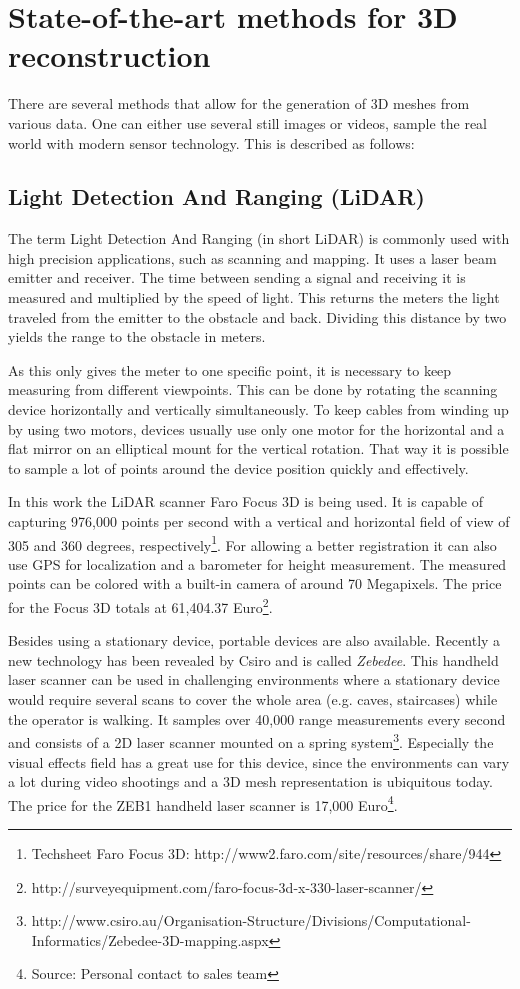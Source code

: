 \section{State-of-the-art methods for 3D reconstruction}

There are several methods that allow for the generation of 3D meshes from various data. One can either use several still images or videos, sample the real world with modern sensor technology. This is described as follows:

\subsection{Light Detection And Ranging (LiDAR)}

The term Light Detection And Ranging (in short LiDAR) is commonly used with high precision applications, such as scanning and mapping. It uses a laser beam emitter and receiver. The time between sending a signal and receiving it is measured and multiplied by the speed of light. This returns the meters the light traveled from the emitter to the obstacle and back. Dividing this distance by two yields the range to the obstacle in meters.

As this only gives the meter to one specific point, it is necessary to keep measuring from different viewpoints. This can be done by rotating the scanning device horizontally and vertically simultaneously. To keep cables from winding up by using two motors, devices usually use only one motor for the horizontal and a flat mirror on an elliptical mount for the vertical rotation. That way it is possible to sample a lot of points around the device position quickly and effectively.

In this work the LiDAR scanner Faro Focus 3D is being used. It is capable of capturing 976,000 points per second with a vertical and horizontal field of view of 305 and 360 degrees, respectively\footnote{Techsheet Faro Focus 3D: http://www2.faro.com/site/resources/share/944}. For allowing a better registration it can also use GPS for localization and a barometer for height measurement. The measured points can be colored with a built-in camera of around 70 Megapixels. The price for the Focus 3D totals at 61,404.37 Euro\footnote{http://surveyequipment.com/faro-focus-3d-x-330-laser-scanner/}.

Besides using a stationary device, portable devices are also available. Recently a new technology has been revealed by Csiro and is called \textit{Zebedee}. This handheld laser scanner can be used in challenging environments where a stationary device would require several scans to cover the whole area (e.g. caves, staircases) while the operator is walking. It samples over 40,000 range measurements every second and consists of a 2D laser scanner mounted on a spring system\footnote{http://www.csiro.au/Organisation-Structure/Divisions/Computational-Informatics/Zebedee-3D-mapping.aspx}. Especially the visual effects field has a great use for this device, since the environments can vary a lot during video shootings and a 3D mesh representation is ubiquitous today. The price for the ZEB1 handheld laser scanner is 17,000 Euro\footnote{Source: Personal contact to sales team}.


